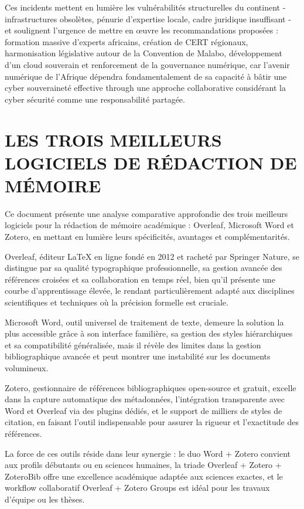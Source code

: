\documentclass[12pt,a4paper]{article}
\begin{document}
Ces incidents mettent en lumière les vulnérabilités structurelles du continent - infrastructures obsolètes, pénurie d'expertise locale, cadre juridique insuffisant - et soulignent l'urgence de mettre en œuvre les recommandations proposées : formation massive d'experts africains, création de CERT régionaux, harmonisation législative autour de la Convention de Malabo, développement d'un cloud souverain et renforcement de la gouvernance numérique, car l'avenir numérique de l'Afrique dépendra fondamentalement de sa capacité à bâtir une cyber souveraineté effective through une approche collaborative considérant la cyber sécurité comme une responsabilité partagée.

\section{LES TROIS MEILLEURS LOGICIELS DE RÉDACTION DE MÉMOIRE}

Ce document présente une analyse comparative approfondie des trois meilleurs logiciels pour la rédaction de mémoire académique : Overleaf, Microsoft Word et Zotero, en mettant en lumière leurs spécificités, avantages et complémentarités. 

Overleaf, éditeur LaTeX en ligne fondé en 2012 et racheté par Springer Nature, se distingue par sa qualité typographique professionnelle, sa gestion avancée des références croisées et sa collaboration en temps réel, bien qu'il présente une courbe d'apprentissage élevée, le rendant particulièrement adapté aux disciplines scientifiques et techniques où la précision formelle est cruciale. 

Microsoft Word, outil universel de traitement de texte, demeure la solution la plus accessible grâce à son interface familière, sa gestion des styles hiérarchiques et sa compatibilité généralisée, mais il révèle des limites dans la gestion bibliographique avancée et peut montrer une instabilité sur les documents volumineux. 

Zotero, gestionnaire de références bibliographiques open-source et gratuit, excelle dans la capture automatique des métadonnées, l'intégration transparente avec Word et Overleaf via des plugins dédiés, et le support de milliers de styles de citation, en faisant l'outil indispensable pour assurer la rigueur et l'exactitude des références. 

La force de ces outils réside dans leur synergie : le duo Word + Zotero convient aux profils débutants ou en sciences humaines, la triade Overleaf + Zotero + ZoteroBib offre une excellence académique adaptée aux sciences exactes, et le workflow collaboratif Overleaf + Zotero Groups est idéal pour les travaux d'équipe ou les thèses. 
\end{document}
